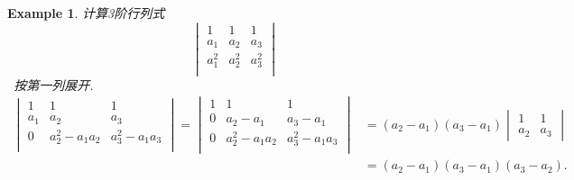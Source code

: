 \documentclass{article}
\newtheorem{example}[theorem]{Example}
\newcommand{\hints}{{\color{blue} \text{hints}}}
\begin{document}
\begin{example}
\rm 计算3阶行列式
$$
\begin{vmatrix}
1 & 1 & 1\\
a_1 & a_2 & a_3 \\
a_1^2 & a_2^2 & a_3^2 \\
\end{vmatrix}
$$
\hints\ 按第一列展开.
$$
\begin{array}{ll}
\begin{vmatrix}
1 & 1 & 1\\
a_1 & a_2 & a_3 \\
0 & a_2^2-a_1a_2 & a_3^2-a_1a_3 \\
\end{vmatrix} = 
\begin{vmatrix}
1 & 1 & 1\\
0 & a_2-a_1 & a_3-a_1 \\
0 & a_2^2-a_1a_2 & a_3^2-a_1a_3 \\
\end{vmatrix} &=
(a_2-a_1)(a_3-a_1)
\begin{vmatrix}
1 & 1 \\
a_2 & a_3
\end{vmatrix} \\
&= (a_2-a_1)(a_3-a_1)(a_3-a_2).
\end{array}
$$
\end{example}
\end{document}
